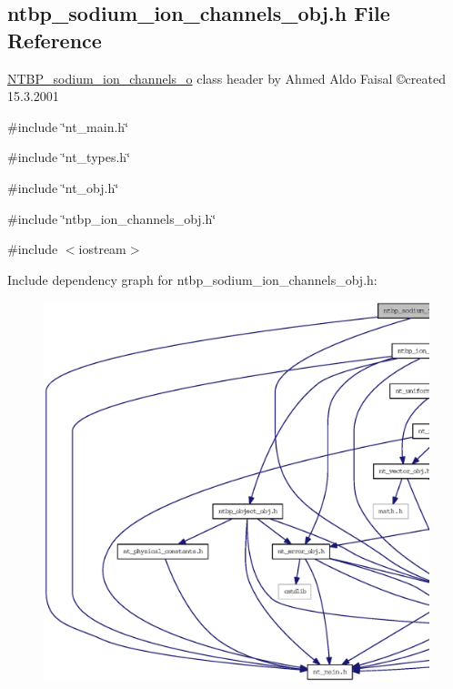 \subsection{ntbp\_\-sodium\_\-ion\_\-channels\_\-obj.h File Reference}
\label{ntbp__sodium__ion__channels__obj_8h}



\begin{DoxyItemize}
\item \hyperlink{class_n_t_b_p__sodium__ion__channels__o}{NTBP\_\-sodium\_\-ion\_\-channels\_\-o} class header by Ahmed Aldo Faisal \copyright created 15.3.2001 
\end{DoxyItemize} 


{\ttfamily \#include \char`\"{}nt\_\-main.h\char`\"{}}\par
{\ttfamily \#include \char`\"{}nt\_\-types.h\char`\"{}}\par
{\ttfamily \#include \char`\"{}nt\_\-obj.h\char`\"{}}\par
{\ttfamily \#include \char`\"{}ntbp\_\-ion\_\-channels\_\-obj.h\char`\"{}}\par
{\ttfamily \#include $<$iostream$>$}\par
Include dependency graph for ntbp\_\-sodium\_\-ion\_\-channels\_\-obj.h:
\nopagebreak
\begin{figure}[H]
\begin{center}
\leavevmode
\includegraphics[width=400pt]{ntbp__sodium__ion__channels__obj_8h__incl}
\end{center}
\end{figure}
